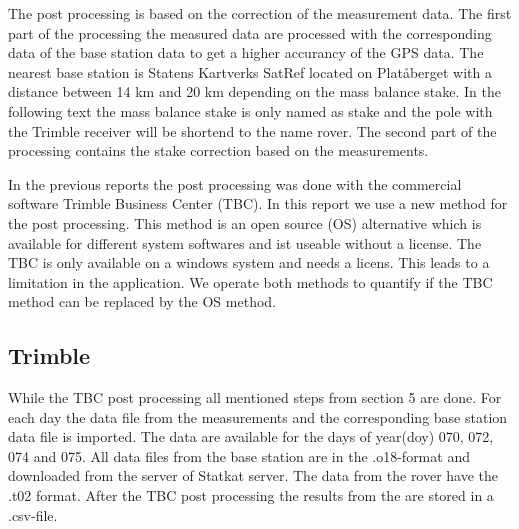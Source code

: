 
The post processing is based on the correction of the measurement data.
The first part of the processing the measured data are processed with the corresponding data of the base station data to get a higher accurancy of the GPS data.
The nearest base station is Statens Kartverks SatRef located on Platåberget with a distance between 14 km and 20 km depending on the mass balance stake.
In the following text the mass balance stake is only named as stake and the pole with the Trimble receiver will be shortend to the name rover.
The second part of the processing contains the stake correction based on the measurements.
\medskip

In the previous reports the post processing was done with the commercial software Trimble Business Center (TBC). 
In this report we use a new method for the post processing. 
This method is an open source (OS) alternative which is available for different system softwares and ist useable without a license. 
The TBC is only available on a windows system and needs a licens.
This leads to a limitation in the application. 
We operate both methods to quantify if the TBC method can be replaced by the OS method.

\subsection{Trimble}

While the TBC post processing all mentioned steps from section 5 \cite{Trquickstart} are done.
For each day the data file from the measurements and the corresponding base station data file is imported. 
The data are available for the days of year(doy) 070, 072, 074 and 075.
All data files from the base station are in the .o18-format and downloaded from the server of Statkat server.
The data from the rover have the .t02 format. 
After the TBC post processing the results from the are stored in a .csv-file.
\medskip

